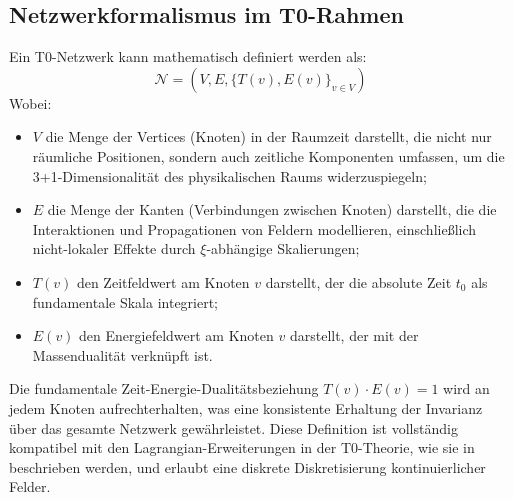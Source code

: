 \subsection{Netzwerkformalismus im T0-Rahmen}
\label{subsec:network_formalism}
Ein T0-Netzwerk kann mathematisch definiert werden als:
\begin{equation}
	\mathcal{N} = (V, E, \{T(v), E(v)\}_{v \in V})
\end{equation}
Wobei:
\begin{itemize}
	\item $V$ die Menge der Vertices (Knoten) in der Raumzeit darstellt, die nicht nur räumliche Positionen, sondern auch zeitliche Komponenten umfassen, um die 3+1-Dimensionalität des physikalischen Raums widerzuspiegeln;
	\item $E$ die Menge der Kanten (Verbindungen zwischen Knoten) darstellt, die die Interaktionen und Propagationen von Feldern modellieren, einschließlich nicht-lokaler Effekte durch $\xi$-abhängige Skalierungen;
	\item $T(v)$ den Zeitfeldwert am Knoten $v$ darstellt, der die absolute Zeit $t_0$ als fundamentale Skala integriert;
	\item $E(v)$ den Energiefeldwert am Knoten $v$ darstellt, der mit der Massendualität verknüpft ist.
\end{itemize}
Die fundamentale Zeit-Energie-Dualitätsbeziehung $T(v) \cdot E(v) = 1$ wird an jedem Knoten aufrechterhalten, was eine konsistente Erhaltung der Invarianz über das gesamte Netzwerk gewährleistet. Diese Definition ist vollständig kompatibel mit den Lagrangian-Erweiterungen in der T0-Theorie, wie sie in \cite{T0_tm_erweiterung} beschrieben werden, und erlaubt eine diskrete Diskretisierung kontinuierlicher Felder.
